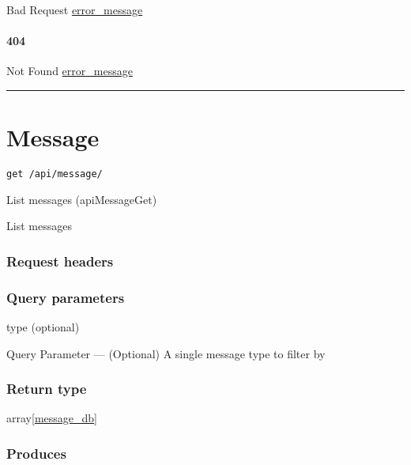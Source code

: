 Bad Request \protect\hyperlink{error_message}{error\_message}

\hypertarget{section-296}{%
\paragraph{404}\label{section-296}}

Not Found \protect\hyperlink{error_message}{error\_message}

\begin{center}\rule{0.5\linewidth}{\linethickness}\end{center}

\hypertarget{message-1}{%
\section{\texorpdfstring{\protect\hypertarget{Message}{}{Message}}{Message}}\label{message-1}}

\protect\hypertarget{apiMessageGet}{}{}

\begin{verbatim}
get /api/message/
\end{verbatim}

List messages ({apiMessageGet})

List messages

\hypertarget{request-headers-47}{%
\subsubsection{Request headers}\label{request-headers-47}}

\hypertarget{query-parameters-3}{%
\subsubsection{Query parameters}\label{query-parameters-3}}

type (optional)

{Query Parameter} --- (Optional) A single message type to filter by

\hypertarget{return-type-72}{%
\subsubsection{Return type}\label{return-type-72}}

array{[}\protect\hyperlink{message_db}{message\_db}{]}

\hypertarget{produces-89}{%
\subsubsection{Produces}\label{produces-89}}

